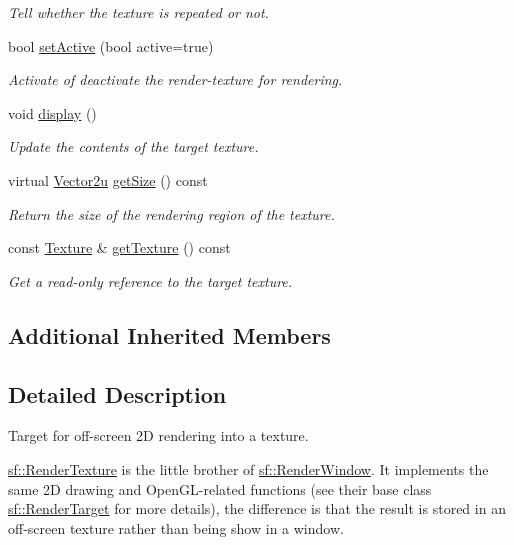\begin{DoxyCompactItemize}
\begin{DoxyCompactList}\small\item\em Tell whether the texture is repeated or not. \end{DoxyCompactList}\item 
bool \hyperlink{classsf_1_1_render_texture_a5da95ecdbce615a80bb78399012508cf}{set\+Active} (bool active=true)
\begin{DoxyCompactList}\small\item\em Activate of deactivate the render-\/texture for rendering. \end{DoxyCompactList}\item 
void \hyperlink{classsf_1_1_render_texture_af92886d5faef3916caff9fa9ab32c555}{display} ()
\begin{DoxyCompactList}\small\item\em Update the contents of the target texture. \end{DoxyCompactList}\item 
virtual \hyperlink{classsf_1_1_vector2}{Vector2u} \hyperlink{classsf_1_1_render_texture_a757ba45ec7a7deefcaef717049b00b8c}{get\+Size} () const 
\begin{DoxyCompactList}\small\item\em Return the size of the rendering region of the texture. \end{DoxyCompactList}\item 
const \hyperlink{classsf_1_1_texture}{Texture} \& \hyperlink{classsf_1_1_render_texture_a95bc5152c497066d31fdc57da8e17678}{get\+Texture} () const 
\begin{DoxyCompactList}\small\item\em Get a read-\/only reference to the target texture. \end{DoxyCompactList}\end{DoxyCompactItemize}
\subsection*{Additional Inherited Members}


\subsection{Detailed Description}
Target for off-\/screen 2\+D rendering into a texture. 

\hyperlink{classsf_1_1_render_texture}{sf\+::\+Render\+Texture} is the little brother of \hyperlink{classsf_1_1_render_window}{sf\+::\+Render\+Window}. It implements the same 2\+D drawing and Open\+G\+L-\/related functions (see their base class \hyperlink{classsf_1_1_render_target}{sf\+::\+Render\+Target} for more details), the difference is that the result is stored in an off-\/screen texture rather than being show in a window.

